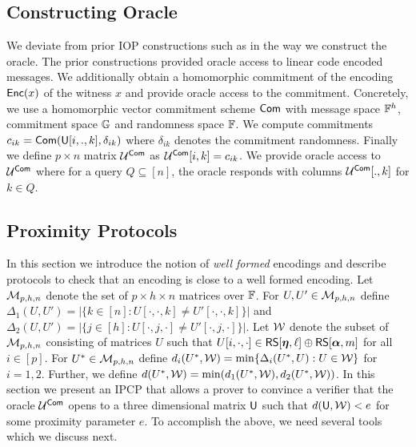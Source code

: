 \subsection{Constructing Oracle}\label{sec:construct_oracle} 
We deviate from prior IOP constructions
such as \cite{Ligero2017,Aurora} in the way we construct the oracle. The prior
constructions provided oracle access to linear code encoded messages. We
additionally obtain a homomorphic commitment of the encoding $\mathsf{Enc}(x)$ of the
witness $x$ and provide oracle access to the commitment. Concretely, we use a
homomorphic vector commitment scheme $\mathsf{Com}$ with message space $\mathbb{F}^h$,
commitment space $\mathbb{G}$ and randomness space $\mathbb{F}$. We compute commitments
$c_{ik}=\mathsf{Com}(\mathsf{U}[i,.,k],\delta_{ik})$ where $\delta_{ik}$ denotes the
commitment randomness. Finally we define $p\times n$ matrix $\mathcal{U}^{\mathsf{Com}}$ as
$\mathcal{U}^{\mathsf{Com}}[i,k]=c_{ik}$. We provide oracle access to $\mathcal{U}^{\mathsf{Com}}$ where for a
query $Q\subseteq [n]$, the oracle responds with columns $\mathcal{U}^{\mathsf{Com}}[.,k]$ for
$k\in Q$.

\subsection{Proximity Protocols}\label{sec:proximityprotocols}
In this section we introduce the notion of {\em well formed} encodings and
describe protocols to check that an encoding is close to a well formed encoding. Let
$\mathcal{M}_{p,h,n}$ denote the set of $p\times h\times n$ matrices over $\mathbb{F}$. For
$U,U'\in \mathcal{M}_{p,h,n}$ define $\Delta_1(U,U')=|\{k\in [n]: U[\cdot,\cdot,k]\neq
U'[\cdot,\cdot,k]\}|$ and $\Delta_2(U,U')=|\{j\in [h]: U[\cdot,j,\cdot]\neq
U'[\cdot,j,\cdot]\}|$. Let $\mathcal{W}$ denote the subset of $\mathcal{M}_{p,h,n}$
consisting of matrices $U$ such that $U[i,\cdot,\cdot]\in \mathsf{RS}[\bm{\eta},\ell]\oplus
\mathsf{RS}[\bm{\alpha},m]$ for all $i\in [p]$. For $U^\ast\in \mathcal{M}_{p,h,n}$ define
$d_i(U^\ast,\mathcal{W})=\min\{\Delta_i(U^\ast,U):U\in \mathcal{W}\}$ for $i=1,2$.
Further, we define
$d(U^\ast,\mathcal{W})=\min(d_1(U^\ast,\mathcal{W}),d_2(U^\ast,\mathcal{W}))$. In this
section we present an IPCP that allows a prover to convince a verifier that
the oracle $\mathcal{U}^{\mathsf{Com}}$ opens to a three dimensional matrix $\mathsf{U}$ such that
$d(\mathsf{U},\mathcal{W})<e$ for some proximity parameter
$e$. To accomplish the above, we need several tools which we discuss next.
 
